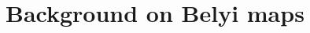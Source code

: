 \documentclass{dcthesis}
\newcommand{\CC}{\mathbb C}
\newcommand{\defi}[1]{\textsf{#1}}
\numberwithin{equation}{section}
\theoremstyle{definition}
\newtheorem{definition}[equation]{Definition}
\theoremstyle{remark}
\begin{document}
{\chapter{Background on Belyi maps}{\label{chapter:backgroundbelyimaps}
}}
\end{document}
